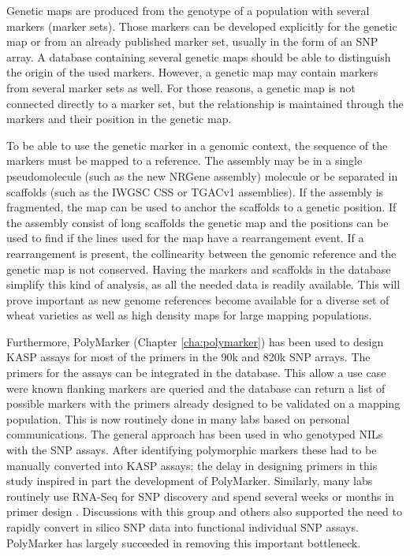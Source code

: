 Genetic maps are produced from the genotype of a population with several markers (marker sets). 
Those markers can be developed explicitly for the genetic map or from an already published marker set, usually in the form of an SNP array. 
A database containing several genetic maps should be able to distinguish the origin of the used markers.
However, a genetic map may contain markers from several marker sets as well.
For those reasons, a genetic map is not connected directly to a marker set, but the relationship is maintained through the markers and their position in the genetic map.

To be able to use the genetic marker in a genomic context, the sequence of the markers must be mapped to a reference. 
The assembly may be in a single pseudomolecule (such as the new NRGene assembly) molecule or be separated in scaffolds (such as the IWGSC CSS or TGACv1 assemblies). 
If the assembly is fragmented, the  map can be used to anchor the scaffolds to a genetic position. 
If the assembly consist of long scaffolds the genetic map and the positions can be used to find if the lines used for the map have a rearrangement event. 
If a rearrangement is present, the collinearity between the genomic reference and the genetic map is not conserved. 
Having the markers and scaffolds in the database simplify this kind of analysis, as all the needed data is readily available. 
This will prove important as new genome references become available for a diverse set of wheat varieties as well as high density maps for large mapping populations. 

Furthermore, PolyMarker (Chapter \ref{cha:polymarker}) has been used to design KASP assays for most of the primers in the 90k \citep{Wang2014} and 820k \citet{Winfield2016} SNP arrays. 
The primers for the assays can be integrated in the database. 
This allow a use case were known flanking markers are queried and the database can return a list of possible markers with the primers already designed to be validated on a mapping population. 
This is now routinely done in many labs based on personal communications. 
The general approach has been used in \citet{Simmonds2014} who genotyped NILs with the SNP assays. 
After identifying polymorphic markers these had to be manually converted into KASP assays; the delay in designing primers in this study inspired in part the development of PolyMarker. 
Similarly, many labs routinely use RNA-Seq for SNP discovery and spend several weeks or months in primer design \citep{Shatalina2013}. 
Discussions with this group and others also supported the need to rapidly convert in silico SNP data into functional individual SNP assays. 
PolyMarker has largely succeeded in removing this important bottleneck. 

